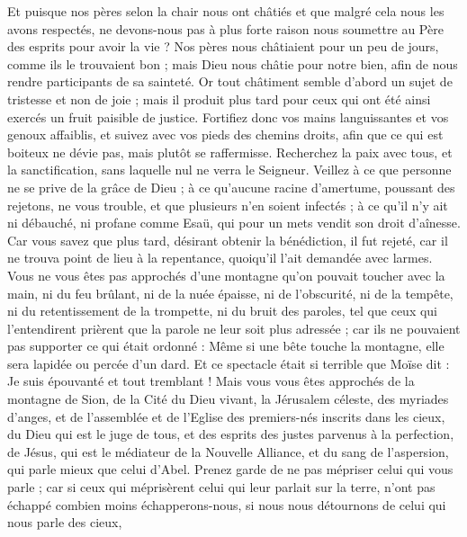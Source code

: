 \begin{multicols}{2}
Et puisque nos pères selon la chair nous ont châtiés et que malgré cela nous les avons respectés, ne devons-nous pas à plus forte raison nous soumettre au Père des esprits pour avoir la vie ?
Nos pères nous châtiaient pour un peu de jours, comme ils le trouvaient bon ; mais Dieu nous châtie pour notre bien, afin de nous rendre participants de sa sainteté.
Or tout châtiment semble d’abord un sujet de tristesse et non de joie ; mais il produit plus tard pour ceux qui ont été ainsi exercés un fruit paisible de justice.
Fortifiez donc vos mains languissantes et vos genoux affaiblis,
et suivez avec vos pieds des chemins droits, afin que ce qui est boiteux ne dévie pas, mais plutôt se raffermisse.
Recherchez la paix avec tous, et la sanctification, sans laquelle nul ne verra le Seigneur.
Veillez à ce que personne ne se prive de la grâce de Dieu ; à ce qu’aucune racine d'amertume, poussant des rejetons, ne vous trouble, et que plusieurs n’en soient infectés ;
à ce qu’il n’y ait ni débauché, ni profane comme Esaü, qui pour un mets vendit son droit d’aînesse.
Car vous savez que plus tard, désirant obtenir la bénédiction, il fut rejeté, car il ne trouva point de lieu à la repentance, quoiqu'il l’ait demandée avec larmes.
Vous ne vous êtes pas approchés d’une montagne qu’on pouvait toucher avec la main, ni du feu brûlant, ni de la nuée épaisse, ni de l'obscurité, ni de la tempête,
ni du retentissement de la trompette, ni du bruit des paroles, tel que ceux qui l'entendirent prièrent que la parole ne leur soit plus adressée ;
car ils ne pouvaient pas supporter ce qui était ordonné : Même si une bête touche la montagne, elle sera lapidée ou percée d'un dard.
Et ce spectacle était si terrible que Moïse dit : Je suis épouvanté et tout tremblant !
Mais vous vous êtes approchés de la montagne de Sion, de la Cité du Dieu vivant, la Jérusalem céleste, des myriades d'anges,
et de l'assemblée et de l'Eglise des premiers-nés inscrits dans les cieux, du Dieu qui est le juge de tous, et des esprits des justes parvenus à la perfection,
de Jésus, qui est le médiateur de la Nouvelle Alliance, et du sang de l'aspersion, qui parle mieux que celui d'Abel.
Prenez garde de ne pas mépriser celui qui vous parle ; car si ceux qui méprisèrent celui qui leur parlait sur la terre, n’ont pas échappé combien moins échapperons-nous, si nous nous détournons de celui qui nous parle des cieux,

\end{multicols}
